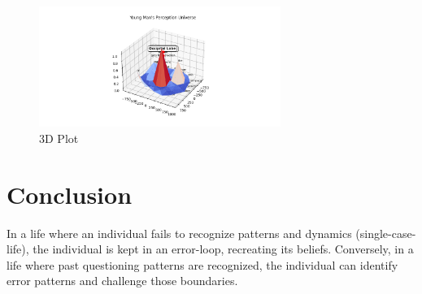 \documentclass{article}
\begin{document}
    \begin{figure}[ht]
        \centering
        \includegraphics[width=0.7\textwidth]{3d_plot.png}
        \caption{3D Plot}
        \label{fig:3dplot}
    \end{figure}


    \section{Conclusion}

    In a life where an individual fails to recognize patterns and dynamics (single-case-life), the individual is kept in an error-loop, recreating its beliefs. Conversely, in a life where past questioning patterns are recognized, the individual can identify error patterns and challenge those boundaries.
\end{document}
